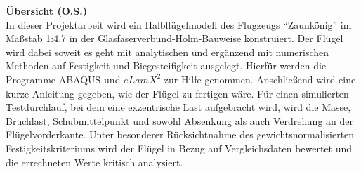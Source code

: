 \noindent\large{\textbf{Übersicht (O.S.)}}~\\

\noindent In dieser Projektarbeit wird ein Halbflügelmodell des Flugzeugs “Zaunkönig” im Maßstab 1:4,7 in der Glasfaserverbund-Holm-Bauweise konstruiert. Der Flügel wird dabei soweit es geht mit analytischen und ergänzend mit numerischen Methoden auf Festigkeit und Biegesteifigkeit ausgelegt. Hierfür werden die Programme ABAQUS und $ eLamX^{2} $ zur Hilfe genommen. Anschließend wird eine kurze Anleitung gegeben, wie der Flügel zu fertigen wäre. Für einen simulierten Testdurchlauf, bei dem eine exzentrische Last aufgebracht wird, wird die Masse, Bruchlast, Schubmittelpunkt und sowohl Absenkung als auch Verdrehung an der Flügelvorderkante. Unter besonderer Rücksichtnahme des gewichtsnormalisierten Festigkeitskriteriums wird der Flügel in Bezug auf Vergleichsdaten bewertet und die errechneten Werte kritisch analysiert.